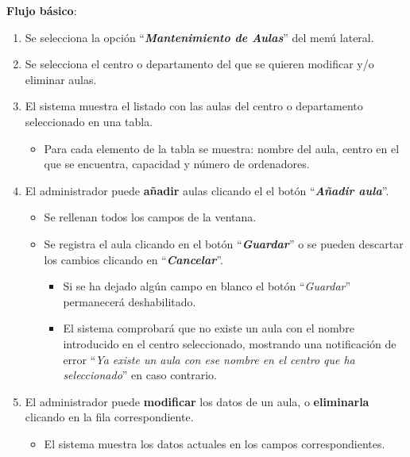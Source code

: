 \textbf{Flujo básico}:
    \begin{enumerate}
        \item Se selecciona la opción ``\textbf{\textit{Mantenimiento de Aulas}}'' del menú lateral.
        
        \item Se selecciona el centro o departamento del que se quieren modificar y/o eliminar aulas.
        
        \item El sistema muestra el listado con las aulas del centro o departamento seleccionado en una tabla.
            \begin{itemize}
                \item Para cada elemento de la tabla se muestra: nombre del aula, centro en el que se encuentra, capacidad y número de ordenadores.
            \end{itemize}
            
        \item El administrador puede \textbf{añadir} aulas clicando el el botón ``\textbf{\textit{Añadir aula}}''.
            \begin{itemize}
            \tightlist
                \item Se rellenan todos los campos de la ventana.
                
                \item Se registra el aula clicando en el botón ``\textbf{\textit{Guardar}}'' o se pueden descartar los cambios clicando en  ``\textbf{\textit{Cancelar}}''. 
                    \begin{itemize}
                    \tightlist
                        \item Si se ha dejado algún campo en blanco el botón ``\textit{Guardar}'' permanecerá deshabilitado.
                        
                        \item El sistema comprobará que no existe un aula con el nombre introducido en el centro seleccionado, mostrando una notificación de error ``\textit{Ya existe un aula con ese nombre en el centro que ha seleccionado}'' en caso contrario.
                    \end{itemize}
            \end{itemize}
            
        \item El administrador puede \textbf{modificar} los datos de un aula, o  \textbf{eliminarla} clicando en la fila correspondiente.
            \begin{itemize}
            \tightlist
                \item El sistema muestra los datos actuales en los campos correspondientes.
                

\end{itemize}
\end{enumerate}
